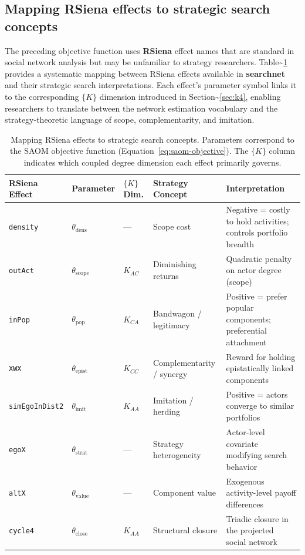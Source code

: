 \documentclass[
]{article}
\begin{document}
\subsection{Mapping RSiena effects to strategic search
concepts}\label{sec:glossary}

The preceding objective function uses \textbf{RSiena} effect names that
are standard in social network analysis but may be unfamiliar to
strategy researchers. Table\textasciitilde{}\ref{tab:glossary} provides
a systematic mapping between RSiena effects available in
\textbf{searchnet} and their strategic search interpretations. Each
effect's parameter symbol links it to the corresponding \(\{K\}\)
dimension introduced in Section\textasciitilde{}\ref{sec:k4}, enabling
researchers to translate between the network estimation vocabulary and
the strategy-theoretic language of scope, complementarity, and
imitation.

\begin{table}[t]
\centering
\caption{Mapping RSiena effects to strategic search concepts.  Parameters correspond to the SAOM objective function (Equation~\ref{eq:saom-objective}).  The $\{K\}$ column indicates which coupled degree dimension each effect primarily governs.}
\label{tab:glossary}
\begin{tabular}{lllll}
\toprule
RSiena Effect & Parameter & $\{K\}$ Dim. & Strategy Concept & Interpretation \\
\midrule
\texttt{density}      & $\theta_{\text{dens}}$  & ---        & Scope cost               & Negative = costly to hold activities; controls portfolio breadth \\
\texttt{outAct}       & $\theta_{\text{scope}}$ & $K_{AC}$   & Diminishing returns       & Quadratic penalty on actor degree (scope) \\
\texttt{inPop}        & $\theta_{\text{pop}}$   & $K_{CA}$   & Bandwagon / legitimacy    & Positive = prefer popular components; preferential attachment \\
\texttt{XWX}          & $\theta_{\text{epist}}$ & $K_{CC}$   & Complementarity / synergy & Reward for holding epistatically linked components \\
\texttt{simEgoInDist2}& $\theta_{\text{imit}}$  & $K_{AA}$   & Imitation / herding       & Positive = actors converge to similar portfolios \\
\texttt{egoX}         & $\theta_{\text{strat}}$ & ---        & Strategy heterogeneity    & Actor-level covariate modifying search behavior \\
\texttt{altX}         & $\theta_{\text{value}}$ & ---        & Component value           & Exogenous activity-level payoff differences \\
\texttt{cycle4}       & $\theta_{\text{close}}$ & $K_{AA}$   & Structural closure        & Triadic closure in the projected social network \\
\bottomrule
\end{tabular}
\end{table}
\end{document}
